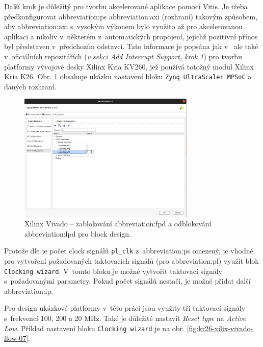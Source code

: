 \documentclass[a4paper, twoside, 11pt]{article}
\begin{document}
				Další krok je důležitý pro tvorbu akcelerované aplikace pomocí Vitis. Je třeba předkonfigurovat \gls{abbreviation:ps} \gls{abbreviation:axi} (rozhraní) takovým způsobem, aby \gls{abbreviation:axi} s~vysokým výkonem bylo využito až pro akcelerovanou aplikaci a nikoliv v~některém z~automatických propojení, jejichž pozitivní přínos byl představen v~předchozím odstavci. Tato informace je popsána jak v~\cite{hackster-getting-started-with-the-kria-kr260-in-vivado} ale také v~oficiálních repozitářích \cite{xilinx-github-vitis-tutorials-step-1-create-the-vivado-hardware-design-and-generate-xsa} (\textit{v sekci Add Interrupt Support, krok 1}) pro tvorbu platformy vývojové desky Xilinx Kria KV260, jež používá totožný modul Xilinx Kria K26. Obr. \ref{fig:kr26-xilix-vivado-flow-06} obsahuje ukázku nastavení bloku \texttt{Zynq UltraScale+ MPSoC} a daných rozhraní.

				\begin{figure}[htbp!]
					\centering
					\includegraphics[width=0.75\textwidth]{src/png/kr26-xilinx-vivado-flow/kr26-xilix-vivado-flow-06.jpg}
					\caption{Xilinx Vivado – zablokování \gls{abbreviation:fpd} a odblokování \gls{abbreviation:lpd} pro block design.}
					\label{fig:kr26-xilix-vivado-flow-06}
				\end{figure}

				Protože dle \cite{xilinx-github-vitis-tutorials-step-1-create-the-vivado-hardware-design-and-generate-xsa} je počet clock signálů \texttt{pl\_clk} z~\gls{abbreviation:ps} omezený, je vhodné pro vytvoření požadovaných taktovacích signálů (pro \gls{abbreviation:pl}) využít blok \texttt{Clocking wizard}. V~tomto bloku je možné vytvořit taktovací signály s~požadovanými parametry. Pokud počet signálů nestačí, je možné přidat další \gls{abbreviation:ip}.\par
				Pro design ukázkové platformy v~této práci jsou využity tři taktovací signály s~frekvencí 100, 200 a 20 MHz. Také je důležité nastavit \textit{Reset type} na \textit{Active Low}. Příklad nastavení bloku \texttt{Clocking wizard} je na obr. \ref{fig:kr26-xilix-vivado-flow-07}.
\end{document}
